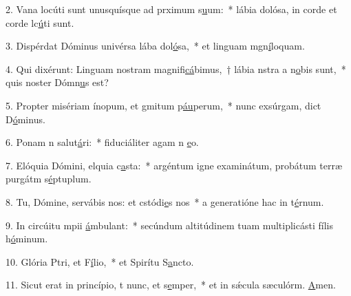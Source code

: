 2. Vana locúti sunt unusquísque ad prximum s\uline{u}um:~* lábia dolósa, in corde et corde lc\uline{ú}ti sunt.\par 
3. Dispérdat Dóminus univérsa lába dol\uline{ó}sa,~* et linguam mgn\uline{í}loquam.\par 
4. Qui dixérunt: Linguam nostram magnifi\uline{cá}bimus,~† lábia nstra a n\uline{o}bis sunt,~* quis noster Dómn\uline{u}s est?\par 
5. Propter misériam ínopum, et gmitum p\uline{áu}perum,~* nunc exsúrgam, dict D\uline{ó}minus.\par 
6. Ponam n salut\uline{á}ri:~* fiduciáliter agam n \uline{e}o.\par 
7. Elóquia Dómini, elquia c\uline{a}sta:~* argéntum igne examinátum, probátum terræ purgátm s\uline{é}ptuplum.\par 
8. Tu, Dómine, servábis nos: et cstódi\uline{e}s nos~* a generatióne hac in t\uline{é}rnum.\par 
9. In circúitu mpii \uline{á}mbulant:~* secúndum altitúdinem tuam multiplicásti fílis h\uline{ó}minum.\par 
10. Glória Ptri, et F\uline{í}lio,~* et Spirítu S\uline{a}ncto.\par 
11. Sicut erat in princípio, t nunc, et s\uline{e}mper,~* et in sǽcula sæculórm. \uline{A}men.\par 
